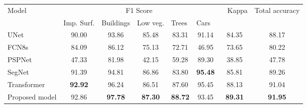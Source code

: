 \documentclass[journal]{IEEEtran}
\begin{document}
\begin{table*}
\begin{tabular}{lccccccc}
\multirow{2}{*}{Model} & \multicolumn{5}{c}{F1 Score}                                                                                                                         & \multicolumn{1}{l}{\multirow{2}{*}{~
  Kappa}} & \multicolumn{1}{l}{\multirow{2}{*}{Total
  accuracy}}  \\ 
\cline{2-6}
                       & \multicolumn{1}{l}{Imp. Surf.} & \multicolumn{1}{l}{Buildings} & \multicolumn{1}{l}{Low veg.} & \multicolumn{1}{l}{Trees} & \multicolumn{1}{l}{Cars} & \multicolumn{1}{l}{}                           & \multicolumn{1}{l}{}                                   \\ 
\hline
UNet                   & 90.00                          & 93.86                         & 85.48                        & 83.31                     & 91.14                    & 84.35                                          & 88.17                                                  \\
FCN8s                  & 84.09                          & 86.12                         & 75.13                        & 72.71                     & 46.95                    & 73.65                                          & 80.22                                                  \\
PSPNet                 & 47.33                          & 81.98                         & 42.15                        & 59.28                     & 89.30                    & 38.85                                          & 47.78                                                  \\
SegNet                 & 91.39                          & 94.81                         & 86.86                        & 83.80                     & \textbf{95.48}           & 85.81                                          & 89.26                                                  \\
Transformer            & \textbf{92.92}                 & 96.24                         & 86.51                        & 87.60                     & 95.45                    & 88.13                                          & 91.04                                                  \\
Proposed model         & 92.86                          & \textbf{97.78}                & \textbf{87.30}               & \textbf{88.72}            & 93.45                    & \textbf{89.31}                                 & \textbf{91.95 }                                        \\
\hline
\end{tabular}
\label{table:2}
\end{table*}
\end{document}
